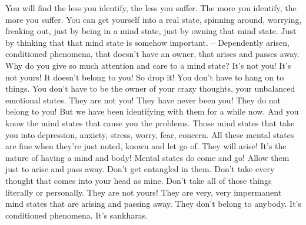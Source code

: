 \documentclass[letterpaper,10pt,english]{sphinxmanual}
\begin{document}
\sphinxAtStartPar
You will find the less you identify, the less you suffer. The more you
identify, the more you suffer. You can get yourself into a real state, spinning
around, worrying, freaking out, just by being in a mind state, just by owning
that mind state. Just by thinking that that mind state is somehow important.
– Dependently arisen, conditioned phenomena, that doesn’t have an owner,
that arises and passes away. Why do you give so much attention and care to
a mind state? It’s not you! It’s not yours! It doesn’t belong to you! So drop it!
  You don’t have to hang on to things. You don’t have to be the owner of your
crazy thoughts, your unbalanced emotional states. They are not you! They
have never been you! They do not belong to you! But we have been identifying with them for a while now. And you know the mind states that cause
you the problems. Those mind states that take you into depression, anxiety,
stress, worry, fear, concern. All these mental states are fine when they’re just
noted, known and let go of. They will arise! It’s the nature of having a mind
and body! Mental states do come and go! Allow them just to arise and pass
away. Don’t get entangled in them. Don’t take every thought that comes into
your head as mine. Don’t take all of those things literally or personally. They
are not yours! They are very, very impermanent mind states that are arising
and passing away. They don’t belong to anybody. It’s conditioned phenomena. It’s sankharas.
\end{document}
